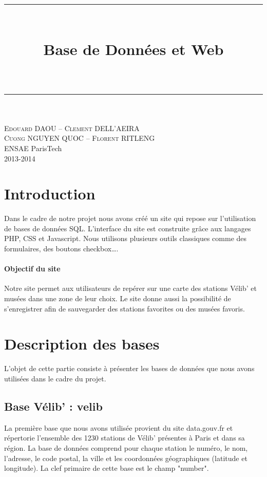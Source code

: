 \documentclass[a4paper]{article}
\title{\vspace{-4mm}\rule{13cm}{0.2pt}\\[0.4cm]
\fontsize{18pt}{15pt}\selectfont\textbf{Base de Données et Web}\\[0.1cm]
\fontsize{11pt}{10pt}\selectfont{Géolocalisation de stations de Vélib' et de musées à Paris}\\[0.4cm]
\rule{13cm}{1.4pt}} %
\date{}
\begin{document}
   \begin{flushright}
   \textsc{Edouard DAOU -- Clement DELL'AEIRA \\
     Cuong NGUYEN QUOC -- Florent RITLENG}\\
   ENSAE ParisTech \\
   2013-2014\\
   \vspace{-5mm}
   \end{flushright}
   \begingroup
   \let\newpage\relax%
\maketitle
\endgroup



\section{Introduction}
Dans le cadre de notre projet nous avons créé un site qui repose sur l'utilisation de bases de données SQL. L'interface du site est construite grâce aux langages PHP, CSS et Javascript. Nous utilisons plusieurs outils classiques comme des formulaires, des boutons checkbox\dots. 
\paragraph{Objectif du site}Notre site permet aux utilisateurs de repérer sur une carte des stations Vélib' et musées dans une zone de leur choix. Le site donne aussi la possibilité de s'enregistrer afin de sauvegarder des stations favorites ou des musées favoris.    
 
\section{Description des bases}

L'objet de cette partie consiste à présenter les bases de données que nous avons utilisées dans le cadre du projet. 

\subsection{Base Vélib' : \textbf{velib}}

La première base que nous avons utilisée provient du site data.gouv.fr et répertorie l'ensemble des 1230 stations de Vélib' présentes à Paris et dans sa région. La base de données comprend pour chaque station le numéro, le nom, l'adresse, le code postal, la ville et les coordonnées géographiques (latitude et longitude). La clef primaire de cette base est le champ "number".
\end{document}
